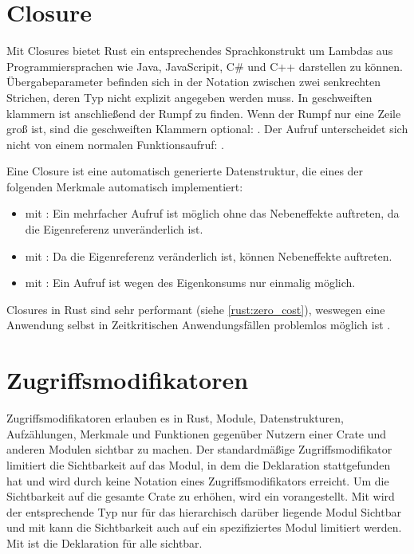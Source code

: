 \section{Closure}
\label{rust:closures}

Mit Closures bietet Rust ein entsprechendes Sprachkonstrukt um Lambdas aus Programmiersprachen wie Java, JavaScripit, C\# und C++ darstellen zu können.
Übergabeparameter befinden sich in der Notation zwischen zwei senkrechten Strichen, deren Typ nicht explizit angegeben werden muss.
In geschweiften klammern ist anschließend der Rumpf zu finden.
Wenn der Rumpf nur eine Zeile groß ist, sind die geschweiften Klammern optional: .
Der Aufruf unterscheidet sich nicht von einem normalen Funktionsaufruf: .

Eine Closure ist eine automatisch generierte Datenstruktur, die eines der folgenden Merkmale automatisch implementiert:
\begin{itemize}
	\item {} mit : Ein mehrfacher Aufruf ist möglich ohne das Nebeneffekte auftreten, da die Eigenreferenz unveränderlich ist.
	\item {} mit : Da die Eigenreferenz veränderlich ist, können Nebeneffekte auftreten.
	\item {} mit : Ein Aufruf ist wegen des Eigenkonsums nur einmalig möglich.
\end{itemize}

Closures in Rust sind sehr performant (siehe \autoref{rust:zero_cost}), weswegen eine Anwendung selbst in Zeitkritischen Anwendungsfällen problemlos möglich ist \cite[310]{rust:orly_programming}.



\section{Zugriffsmodifikatoren}
\label{rust:access_modifier}

Zugriffsmodifikatoren erlauben es in Rust, Module, Datenstrukturen, Aufzählungen, Merkmale und Funktionen gegenüber Nutzern einer Crate und anderen Modulen sichtbar zu machen.
Der standardmäßige Zugriffsmodifikator limitiert die Sichtbarkeit auf das Modul, in dem die Deklaration stattgefunden hat und wird durch keine Notation eines Zugriffsmodifikators erreicht.
Um die Sichtbarkeit auf die gesamte Crate zu erhöhen, wird ein  vorangestellt.
Mit  wird der entsprechende Typ nur für das hierarchisch darüber liegende Modul Sichtbar und mit  kann die Sichtbarkeit auch auf ein spezifiziertes Modul limitiert werden.
Mit  ist die Deklaration für alle sichtbar.


